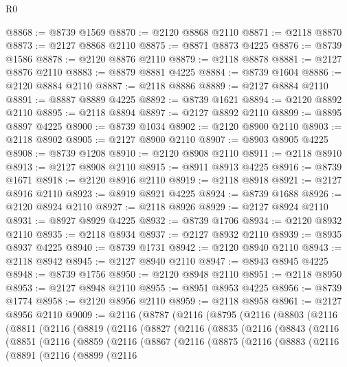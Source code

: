 \begin{lexlean}{R0}
\begin{coremodule}
@8868 := @8739 @1569
@8870 := @2120 @8868 @2110
@8871 := @2118 @8870
@8873 := @2127 @8868 @2110
@8875 := @8871 @8873 @4225
@8876 := @8739 @1586
@8878 := @2120 @8876 @2110
@8879 := @2118 @8878
@8881 := @2127 @8876 @2110
@8883 := @8879 @8881 @4225
@8884 := @8739 @1604
@8886 := @2120 @8884 @2110
@8887 := @2118 @8886
@8889 := @2127 @8884 @2110
@8891 := @8887 @8889 @4225
@8892 := @8739 @1621
@8894 := @2120 @8892 @2110
@8895 := @2118 @8894
@8897 := @2127 @8892 @2110
@8899 := @8895 @8897 @4225
@8900 := @8739 @1034
@8902 := @2120 @8900 @2110
@8903 := @2118 @8902
@8905 := @2127 @8900 @2110
@8907 := @8903 @8905 @4225
@8908 := @8739 @1208
@8910 := @2120 @8908 @2110
@8911 := @2118 @8910
@8913 := @2127 @8908 @2110
@8915 := @8911 @8913 @4225
@8916 := @8739 @1671
@8918 := @2120 @8916 @2110
@8919 := @2118 @8918
@8921 := @2127 @8916 @2110
@8923 := @8919 @8921 @4225
@8924 := @8739 @1688
@8926 := @2120 @8924 @2110
@8927 := @2118 @8926
@8929 := @2127 @8924 @2110
@8931 := @8927 @8929 @4225
@8932 := @8739 @1706
@8934 := @2120 @8932 @2110
@8935 := @2118 @8934
@8937 := @2127 @8932 @2110
@8939 := @8935 @8937 @4225
@8940 := @8739 @1731
@8942 := @2120 @8940 @2110
@8943 := @2118 @8942
@8945 := @2127 @8940 @2110
@8947 := @8943 @8945 @4225
@8948 := @8739 @1756
@8950 := @2120 @8948 @2110
@8951 := @2118 @8950
@8953 := @2127 @8948 @2110
@8955 := @8951 @8953 @4225
@8956 := @8739 @1774
@8958 := @2120 @8956 @2110
@8959 := @2118 @8958
@8961 := @2127 @8956 @2110
@9009 := @2116
    (@8787
      (@2116
        (@8795
          (@2116
            (@8803
              (@2116
                (@8811
                  (@2116
                    (@8819
                      (@2116
                        (@8827
                          (@2116
                            (@8835
                              (@2116
                                (@8843
                                  (@2116
                                    (@8851
                                      (@2116
                                        (@8859
                                          (@2116
                                            (@8867
                                              (@2116
                                                (@8875
                                                  (@2116
                                                    (@8883
                                                      (@2116
                                                        (@8891
                                                          (@2116
                                                            (@8899
                                                              (@2116

\end{coremodule}
\end{lexlean}
